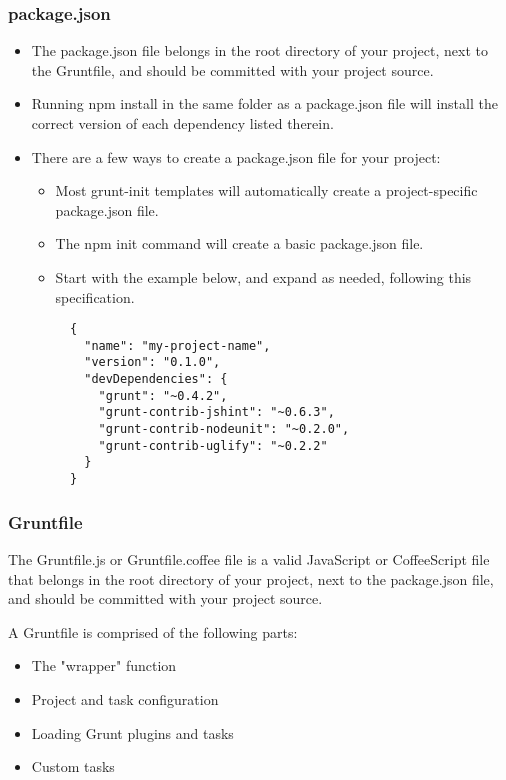 \subsubsection{package.json}

\begin{itemize}
\item
The package.json file belongs in the root directory of your project,
next to the Gruntfile, and should be committed with your project
source. 

\item
Running npm install in the same folder as a package.json file
will install the correct version of each dependency listed therein.

\item
There are a few ways to create a package.json file for your project:

  \begin{itemize}
  \item
  Most grunt-init templates will automatically create a project-specific package.json file.
  \item
  The npm init command will create a basic package.json file.
  \item
  Start with the example below, and expand as needed, following this specification.
  \begin{verbatim}
  {
    "name": "my-project-name",
    "version": "0.1.0",
    "devDependencies": {
      "grunt": "~0.4.2",
      "grunt-contrib-jshint": "~0.6.3",
      "grunt-contrib-nodeunit": "~0.2.0",
      "grunt-contrib-uglify": "~0.2.2"
    }
  }
  \end{verbatim}
  \end{itemize}
\end{itemize}

\subsubsection{Gruntfile}

The Gruntfile.js or Gruntfile.coffee file is a valid JavaScript or
CoffeeScript file that belongs in the root directory of your project,
next to the package.json file, and should be committed with your project
source.

A Gruntfile is comprised of the following parts:

\begin{itemize}
\item
The "wrapper" function
\item
Project and task configuration
\item
Loading Grunt plugins and tasks
\item
Custom tasks
\end{itemize}


